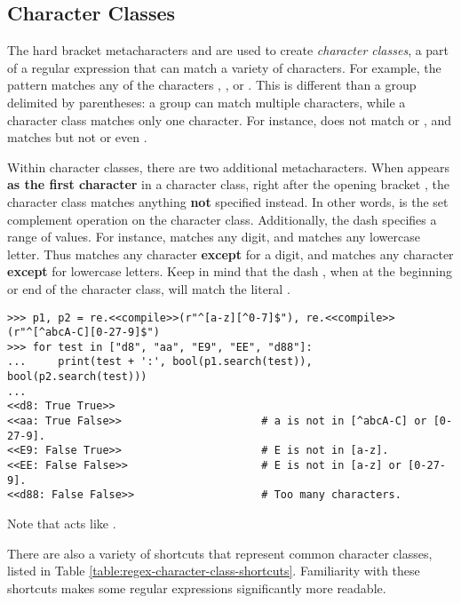 \subsection*{Character Classes} %

The hard bracket metacharacters \li{[} and \li{]} are used to create \emph{character classes}, a part of a regular expression that can match a variety of characters.
For example, the pattern \li{[abc]} matches any of the characters , , or .
This is different than a group delimited by parentheses: a group can match multiple characters, while a character class matches only one character.
For instance, \li{[abc]} does not match  or , and  matches  but not  or even .

Within character classes, there are two additional metacharacters.
When \li{^} appears \textbf{as the first character} in a character class, right after the opening bracket \li{[}, the character class matches anything \textbf{not} specified instead.
In other words, \li{^} is the set complement operation on the character class.
Additionally, the dash \li{-} specifies a range of values.
For instance, \li{[0-9]} matches any digit, and \li{[a-z]} matches any lowercase letter.
Thus \li{[^0-9]} matches any character \textbf{except} for a digit, and \li{[^a-z]} matches any character \textbf{except} for lowercase letters. Keep in mind that the dash \li{-}, when at the beginning or end of the character class, will match the literal . 

\begin{lstlisting}
>>> p1, p2 = re.<<compile>>(r"^[a-z][^0-7]$"), re.<<compile>>(r"^[^abcA-C][0-27-9]$")
>>> for test in ["d8", "aa", "E9", "EE", "d88"]:
...     print(test + ':', bool(p1.search(test)), bool(p2.search(test)))
...
<<d8: True True>>
<<aa: True False>>                      # a is not in [^abcA-C] or [0-27-9].
<<E9: False True>>                      # E is not in [a-z].
<<EE: False False>>                     # E is not in [a-z] or [0-27-9].
<<d88: False False>>                    # Too many characters.
\end{lstlisting}

Note that \li{[0-27-9]} acts like \li{[(0-2)|(7-9)]}.

There are also a variety of shortcuts that represent common character classes, listed in Table \ref{table:regex-character-class-shortcuts}.
Familiarity with these shortcuts makes some regular expressions significantly more readable.

